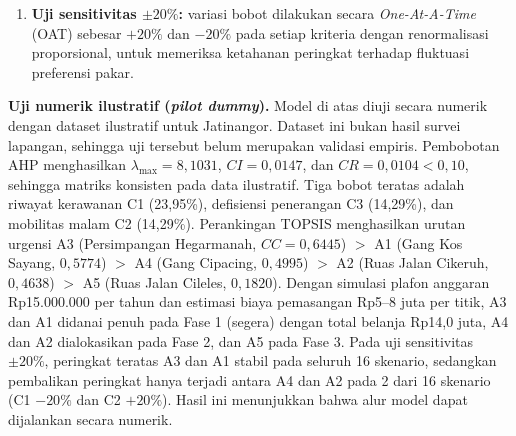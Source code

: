 \documentclass[10pt,twocolumn,a4paper]{article}
\newcommand{\cost}{\mathit{Cost}}
\begin{document}
\begin{enumerate}[label=\arabic*)]
\begin{equation}
\sum_{i\in \text{Fase }k}\cost_i\le B_k.\label{eq:budget}
\end{equation}
Rasio efisiensi biaya urgensi ($\mathit{CC}_i/\cost_i$) dipakai sebagai instrumen pendukung jika terdapat alternatif dengan urgensi berdekatan tetapi selisih biaya implementasi yang tajam.
\item \textbf{Uji sensitivitas $\pm 20\%$:} variasi bobot dilakukan secara \textit{One-At-A-Time} (OAT) sebesar $+20\%$ dan $-20\%$ pada setiap kriteria dengan renormalisasi proporsional, untuk memeriksa ketahanan peringkat terhadap fluktuasi preferensi pakar.
\end{enumerate}

\textbf{Uji numerik ilustratif (\textit{pilot dummy}).} Model di atas diuji secara numerik dengan dataset ilustratif untuk Jatinangor. Dataset ini bukan hasil survei lapangan, sehingga uji tersebut belum merupakan validasi empiris. Pembobotan AHP menghasilkan $\lambda_{\max}=8{,}1031$, $\mathit{CI}=0{,}0147$, dan $\mathit{CR}=0{,}0104<0{,}10$, sehingga matriks konsisten pada data ilustratif. Tiga bobot teratas adalah riwayat kerawanan C1 (23,95\%), defisiensi penerangan C3 (14,29\%), dan mobilitas malam C2 (14,29\%). Perankingan TOPSIS menghasilkan urutan urgensi A3 (Persimpangan Hegarmanah, $\mathit{CC}=0{,}6445$) $>$ A1 (Gang Kos Sayang, $0{,}5774$) $>$ A4 (Gang Cipacing, $0{,}4995$) $>$ A2 (Ruas Jalan Cikeruh, $0{,}4638$) $>$ A5 (Ruas Jalan Cileles, $0{,}1820$). Dengan simulasi plafon anggaran Rp15.000.000 per tahun dan estimasi biaya pemasangan Rp5--8 juta per titik, A3 dan A1 didanai penuh pada Fase 1 (segera) dengan total belanja Rp14,0 juta, A4 dan A2 dialokasikan pada Fase 2, dan A5 pada Fase 3. Pada uji sensitivitas $\pm 20\%$, peringkat teratas A3 dan A1 stabil pada seluruh 16 skenario, sedangkan pembalikan peringkat hanya terjadi antara A4 dan A2 pada 2 dari 16 skenario (C1 $-20\%$ dan C2 $+20\%$). Hasil ini menunjukkan bahwa alur model dapat dijalankan secara numerik.
\end{document}
